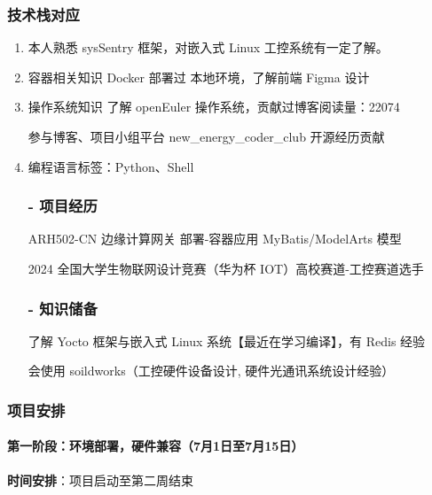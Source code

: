\documentclass[
]{article}
\begin{document}
\subsubsection{技术栈对应}\label{ux6280ux672fux6808ux5bf9ux5e94}

\begin{enumerate}
\def\labelenumi{\arabic{enumi}.}
\item
  本人熟悉 sysSentry 框架，对嵌入式 Linux 工控系统有一定了解。
\item
  容器相关知识 Docker 部署过 本地环境，了解前端 Figma 设计
\item
  操作系统知识 了解 openEuler 操作系统，贡献过博客阅读量：22074

  参与博客、项目小组平台 new\_energy\_coder\_club 开源经历贡献
\item
  编程语言标签：Python、Shell

  \subsubsection{- 项目经历}\label{--ux9879ux76eeux7ecfux5386}

  ARH502-CN 边缘计算网关 部署-容器应用 MyBatis/ModelArts 模型

  2024 全国大学生物联网设计竞赛（华为杯 IOT）高校赛道-工控赛道选手

  \subsubsection{- 知识储备}\label{--ux77e5ux8bc6ux50a8ux5907}

  了解 Yocto 框架与嵌入式 Linux 系统【最近在学习编译】，有 Redis 经验

  会使用 soildworks（工控硬件设备设计, 硬件光通讯系统设计经验）
\end{enumerate}

\subsubsection{项目安排}\label{ux9879ux76eeux5b89ux6392}

\paragraph{第一阶段：环境部署，硬件兼容（7月1日至7月15日）}\label{ux7b2cux4e00ux9636ux6bb5ux73afux5883ux90e8ux7f72ux786cux4ef6ux517cux5bb97ux67081ux65e5ux81f37ux670815ux65e5uxff09}

\textbf{时间安排}：项目启动至第二周结束
\end{document}
